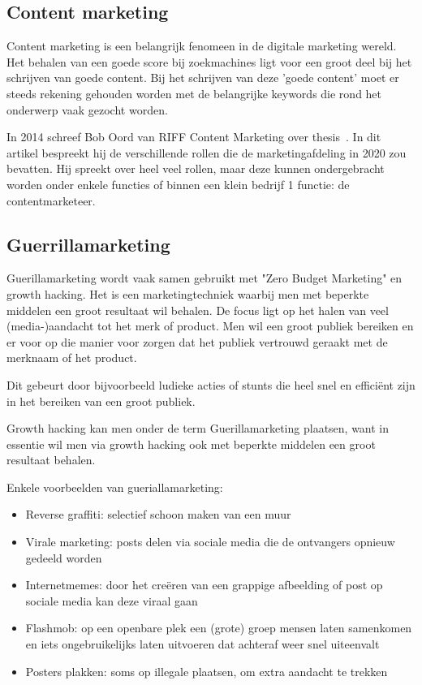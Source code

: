 \subsection{Content marketing}
\label{sec:content-marketing}
Content marketing is een belangrijk fenomeen in de digitale marketing wereld. Het behalen van een goede score bij zoekmachines ligt voor een groot deel bij het schrijven van goede content. Bij het schrijven van deze 'goede content' moet er steeds rekening gehouden worden met de belangrijke keywords die rond het onderwerp vaak gezocht worden. 

In 2014 schreef Bob Oord van RIFF Content Marketing over thesis~. In dit artikel bespreekt hij de verschillende rollen die de marketingafdeling in 2020 zou bevatten. Hij spreekt over heel veel rollen, maar deze kunnen ondergebracht worden onder enkele functies of binnen een klein bedrijf 1 functie: de contentmarketeer. 

\subsection{Guerrillamarketing}
\label{sec:guerrillamarketing}
Guerillamarketing wordt vaak samen gebruikt met "Zero Budget Marketing" en growth hacking. Het is een marketingtechniek waarbij men met beperkte middelen een groot resultaat wil behalen. De focus ligt op het halen van veel (media-)aandacht tot het merk of product. Men wil een groot publiek bereiken en er voor op die manier voor zorgen dat het publiek vertrouwd geraakt met de merknaam of het product.

Dit gebeurt door bijvoorbeeld ludieke acties of stunts die heel snel en efficiënt zijn in het bereiken van een groot publiek. 

Growth hacking kan men onder de term Guerillamarketing plaatsen, want in essentie wil men via growth hacking ook met beperkte middelen een groot resultaat behalen.

Enkele voorbeelden van gueriallamarketing:
 
\begin{itemize}
	\item Reverse graffiti: selectief schoon maken van een muur 
	\item Virale marketing: posts delen via sociale media die de ontvangers opnieuw gedeeld worden
	\item Internetmemes: door het creëren van een grappige afbeelding of post op sociale media kan deze viraal gaan
	\item Flashmob: op een openbare plek een (grote) groep mensen laten samenkomen en iets ongebruikelijks laten uitvoeren dat achteraf weer snel uiteenvalt
	\item Posters plakken: soms op illegale plaatsen, om extra aandacht te trekken
\end{itemize}

